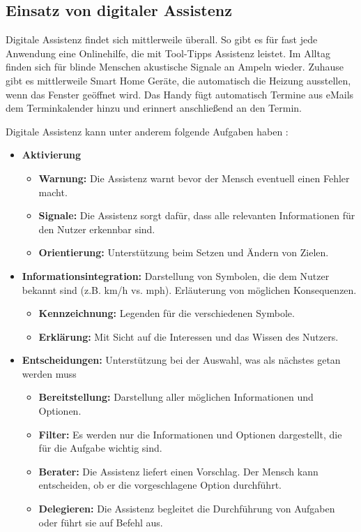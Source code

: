 \subsection{Einsatz von digitaler Assistenz}
Digitale Assistenz findet sich mittlerweile überall. So gibt es für fast jede Anwendung eine Onlinehilfe, die mit Tool-Tipps Assistenz leistet. Im Alltag finden sich für blinde Menschen akustische Signale an Ampeln wieder. Zuhause gibt es mittlerweile Smart Home Geräte, die automatisch die Heizung ausstellen, wenn das Fenster geöffnet wird. Das Handy fügt automatisch Termine aus eMails dem Terminkalender hinzu und erinnert anschließend an den Termin.

Digitale Assistenz kann unter anderem folgende Aufgaben haben \cite{Wandke2005}:
\begin{itemize}
\item \textbf{Aktivierung}
	\begin{itemize}
	\item \textbf{Warnung:} Die Assistenz warnt bevor der Mensch eventuell einen Fehler macht.
	\item \textbf{Signale:} Die Assistenz sorgt dafür, dass alle relevanten Informationen für den Nutzer erkennbar sind.
	\item \textbf{Orientierung:} Unterstützung beim Setzen und Ändern von Zielen.
	\end{itemize}
\item \textbf{Informationsintegration:} Darstellung von Symbolen, die dem Nutzer bekannt sind (z.B. km/h vs. mph). Erläuterung von möglichen Konsequenzen.
	\begin{itemize}
	\item \textbf{Kennzeichnung:} Legenden für die verschiedenen Symbole.
	\item \textbf{Erklärung:} Mit Sicht auf die Interessen und das Wissen des Nutzers.
	\end{itemize}
\item \textbf{Entscheidungen:} Unterstützung bei der Auswahl, was als nächstes getan werden muss
	\begin{itemize}
	\item \textbf{Bereitstellung:} Darstellung aller möglichen Informationen und Optionen.
	\item \textbf{Filter:} Es werden nur die Informationen und Optionen dargestellt, die für die Aufgabe wichtig sind.
	\item \textbf{Berater:} Die Assistenz liefert einen Vorschlag. Der Mensch kann entscheiden, ob er die vorgeschlagene Option durchführt.
	\item \textbf{Delegieren:} Die Assistenz begleitet die Durchführung von Aufgaben oder führt sie auf Befehl aus.
	\end{itemize}
\end{itemize}

